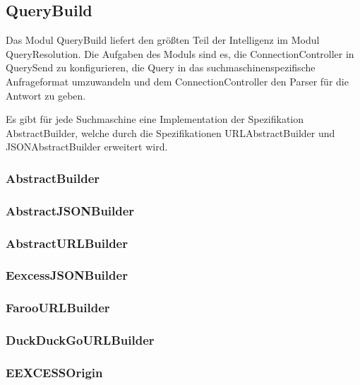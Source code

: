 
\subsection{QueryBuild}

Das Modul QueryBuild liefert den größten Teil der Intelligenz im Modul QueryResolution. Die Aufgaben des Moduls sind es, die ConnectionController in QuerySend zu konfigurieren, die Query in das suchmaschinenspezifische Anfrageformat umzuwandeln und dem ConnectionController den Parser für die Antwort zu geben.

Es gibt für jede Suchmaschine eine Implementation der Spezifikation AbstractBuilder, welche durch die Spezifikationen URLAbstractBuilder und JSONAbstractBuilder erweitert wird.

\subsubsection{AbstractBuilder}
\subsubsection{AbstractJSONBuilder}
\subsubsection{AbstractURLBuilder}
\subsubsection{EexcessJSONBuilder}
\subsubsection{FarooURLBuilder}
\subsubsection{DuckDuckGoURLBuilder}
\subsubsection{EEXCESSOrigin}


